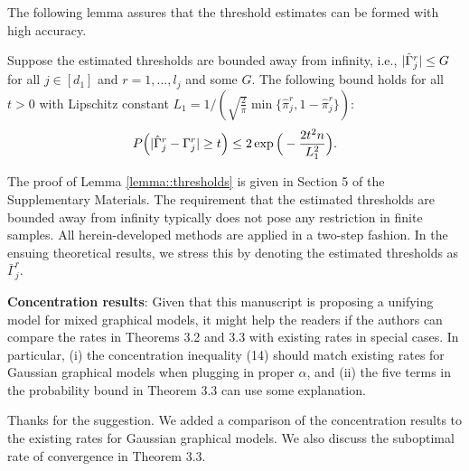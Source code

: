 \begin{change}
    The following lemma assures that the threshold estimates can be formed with high accuracy.
    \begin{lemma}\label{lemma::thresholds}
        Suppose the estimated thresholds are bounded away from infinity, i.e., \(\lvert\hat\Gamma^r_j\rvert \leq G\) for all $j \in [d_1]$ and $r = 1, \dots, l_j$ and some \(G\). The following bound holds for all $t > 0$ with Lipschitz constant \(L_1 = 1/(\sqrt{\frac{2}{\pi}} \min\{\hat\pi^r_j, 1- \hat\pi^r_j\})\):
        \begin{equation*}
            P\Big(\Abs{\hat\Gamma_j^r - \Gamma_j^r} \geq t \Big) \leq 2\exp{\Big(- \frac{2t^2n}{L_1^2}\Big)}.
        \end{equation*}
    \end{lemma}

    The proof of Lemma \ref{lemma::thresholds} is given in Section 5 %
    of the Supplementary Materials. The requirement that the estimated thresholds are bounded away from infinity typically does not pose any restriction in finite samples. All herein-developed methods are applied in a two-step fashion. In the ensuing theoretical results, we stress this by denoting the estimated thresholds as $\bar{\Gamma}_j^r$.
\end{change}


\begin{point}
    \textbf{Concentration results}: Given that this manuscript is proposing a unifying model for mixed graphical models, it might help the readers if the authors can compare the rates in Theorems 3.2 and 3.3 with existing rates in special cases. In particular, (i) the concentration inequality (14) should match existing rates for Gaussian graphical models when plugging in proper \(\alpha\), and (ii) the five terms in the probability bound in Theorem 3.3 can use some explanation.
\end{point}

\begin{reply}
    Thanks for the suggestion. We added a comparison of the concentration results to the existing rates for Gaussian graphical models. We also discuss the suboptimal rate of convergence in Theorem 3.3.
\end{reply}

